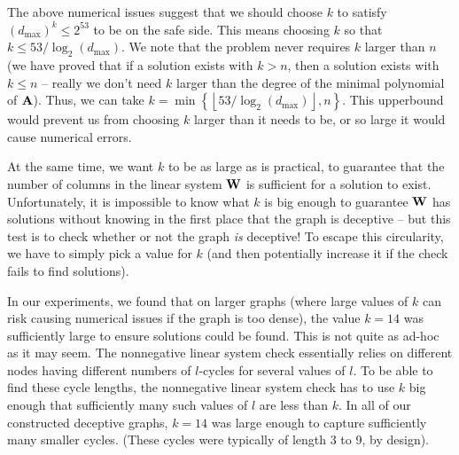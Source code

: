 \documentclass[a4paper,10pt]{article}
\providecommand{\dmax}{d_{\max}}
\providecommand{\floor}[1]{\left\lfloor #1 \right\rfloor}
\begin{document}
The above numerical issues suggest that we should choose $k$ to satisfy $(\dmax)^k \leq 2^{53}$ to be on the safe side. This means choosing $k$ so that $k \leq 53 / \log_2(\dmax)$. We note that the problem never requires $k$ larger than $n$ (we have proved that if a solution exists with $k>n$, then a solution exists with $k \leq n$ -- really we don't need $k$ larger than the degree of the minimal polynomial of $\textbf{A}$). Thus, we can take $k = \min\left\{ \floor{ 53 / \log_2(\dmax) }, n \right\} $.  This upperbound would prevent us from choosing $k$ larger than it needs to be, or so large it would cause numerical errors.


At the same time, we want $k$ to be as large as is practical, to guarantee that the number of columns in the linear system $\textbf{W}$ is sufficient for a solution to exist.
Unfortunately, it is impossible to know what $k$ is big enough to guarantee $\textbf{W}$ has solutions without knowing in the first place that the graph is deceptive -- but this test is to check whether or not the graph \emph{is} deceptive! To escape this circularity, we have to simply pick a value for $k$ (and then potentially increase it if the check fails to find solutions).


In our experiments, we found that on larger graphs (where large values of $k$ can risk causing numerical issues if the graph is too dense), the value $k = 14$ was sufficiently large to ensure solutions could be found. This is not quite as ad-hoc as it may seem. The nonnegative linear system check essentially relies on different nodes having different numbers of $l$-cycles for several values of $l$. To be able to find these cycle lengths, the nonnegative linear system check has to use $k$ big enough that sufficiently many such values of $l$ are less than $k$. In all of our constructed deceptive graphs, $k = 14$ was large enough to capture sufficiently many smaller cycles. (These cycles were typically of length 3 to 9, by design).
\end{document}
